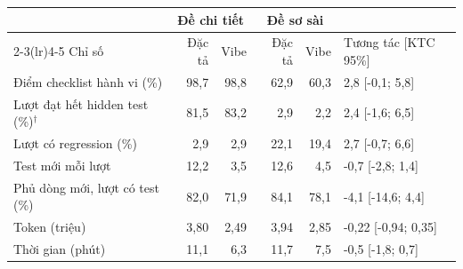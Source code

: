 \begin{tabular}{lrrrrl}
\toprule
 & \multicolumn{2}{c}{Đề chi tiết} & \multicolumn{2}{c}{Đề sơ sài} & \\
\cmidrule(lr){2-3}\cmidrule(lr){4-5}
Chỉ số & Đặc tả & Vibe & Đặc tả & Vibe & Tương tác [KTC 95\%] \\
\midrule
Điểm checklist hành vi (\%) & 98,7 & 98,8 & 62,9 & 60,3 & 2,8 [-0,1; 5,8] \\
Lượt đạt hết hidden test (\%)$^\dagger$ & 81,5 & 83,2 & 2,9 & 2,2 & 2,4 [-1,6; 6,5] \\
Lượt có regression (\%) & 2,9 & 2,9 & 22,1 & 19,4 & 2,7 [-0,7; 6,6] \\
Test mới mỗi lượt & 12,2 & 3,5 & 12,6 & 4,5 & -0,7 [-2,8; 1,4] \\
Phủ dòng mới, lượt có test (\%) & 82,0 & 71,9 & 84,1 & 78,1 & -4,1 [-14,6; 4,4] \\
Token (triệu) & 3,80 & 2,49 & 3,94 & 2,85 & -0,22 [-0,94; 0,35] \\
Thời gian (phút) & 11,1 & 6,3 & 11,7 & 7,5 & -0,5 [-1,8; 0,7] \\
\bottomrule
\end{tabular}
